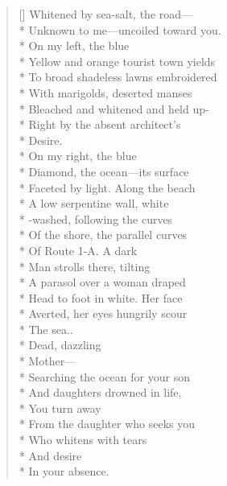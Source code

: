 \label{ch:death_in_july}
\settowidth{\versewidth}{ \qquad  \qquad  \qquad  \qquad You turn away}
\begin{verse}[\versewidth]
Whitened by sea-salt, the road---\\*
Unknown to me---uncoiled toward you.\\*
On my left, the blue\\*
Yellow and orange tourist town yields\\*
To broad shadeless lawns embroidered\\*
With marigolds, deserted manses\\*
Bleached and whitened and held up-\\*
Right by the absent architect's\\*
Desire.\\*
 \qquad On my right, the blue\\*
Diamond, the ocean---its surface\\*
Faceted by light.   Along the beach\\*
A low serpentine wall, white\\*
-washed, following the curves\\*
Of the shore, the parallel curves\\*
Of Route 1-A.   A dark\\*
Man strolls there, tilting\\*
A parasol over a woman draped\\*
Head to foot in white.   Her face\\*
Averted, her eyes hungrily scour\\*
The sea..\\*
 \qquad Dead, dazzling\\*
 \qquad  \qquad  \qquad  \qquad Mother---\\*
Searching the ocean for your son\\*
And daughters drowned in life,\\*
 \qquad  \qquad  \qquad  \qquad You turn away\\*
From the daughter who seeks you\\*
Who whitens with tears\\*
 \qquad  \qquad  \qquad And desire\\*
In your absence.
\end{verse}
